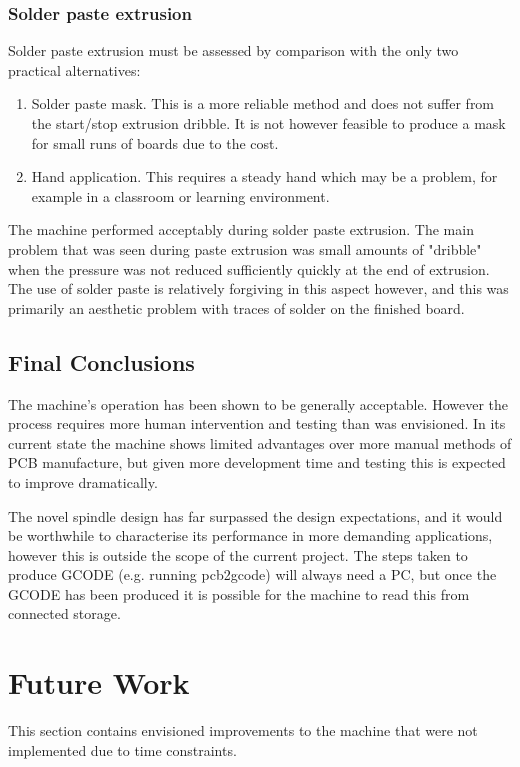 \subsubsection{Solder paste extrusion}
Solder paste extrusion must be assessed by comparison with the only two
practical alternatives:

\begin{enumerate}
\item
Solder paste mask. This is a more reliable method and does not suffer from
the start/stop extrusion dribble. It is not however feasible to produce
a mask for small runs of boards due to the cost. 

\item
Hand application. This requires a steady hand which may be a problem, for
example in a classroom or learning environment.
\end{enumerate}

The machine performed acceptably during solder paste extrusion. The 
main problem that was seen during paste extrusion was small amounts of "dribble"
when the pressure was not reduced sufficiently quickly at the end of extrusion.
The use of solder paste is relatively forgiving in this aspect however, and
this was primarily an aesthetic problem with traces of solder on the finished
board.

\subsection{Final Conclusions}
The machine's operation has been shown to be generally acceptable. However
the process requires more human intervention and testing than was envisioned.
In its current state the machine shows limited advantages over
more manual methods of PCB manufacture, but given more development time
and testing this is expected to improve dramatically.

The novel spindle design has far surpassed the design expectations, and it
would be worthwhile to characterise its performance in more demanding applications,
however this is outside the scope of the current project.
The steps taken to produce GCODE (e.g. running pcb2gcode) will always need a PC, but once the GCODE has been produced it is possible for the machine to read this from connected storage.

\section{Future Work}
This section contains envisioned improvements to the machine that were not implemented due to time constraints.

